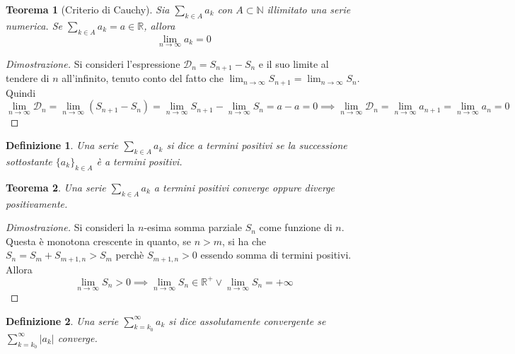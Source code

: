 \documentclass{article}
\newtheorem{theorem}{Teorema}
\newtheorem{definition}{Definizione}
\begin{document}
        \vspace{10pt}
        \begin{theorem}[Criterio di Cauchy]
            Sia $\sum_{k \in A} a_{k}$ con $A \subset \mathbb{N}$ illimitato una serie numerica. Se $\sum_{k \in A} a_{k} = a \in \mathbb{R}$, allora 
            \[
                \lim_{n \rightarrow \infty} a_{k} = 0
            \]
        \end{theorem}
        \begin{proof}[Dimostrazione]
            Si consideri l'espressione $\mathcal{D}_{n} = S_{n + 1} - S_{n}$ e il suo limite al tendere di $n$ all'infinito, tenuto conto del fatto che $\lim_{n \rightarrow \infty} S_{n + 1} = \lim_{n \rightarrow \infty} S_{n}$.
            Quindi
            \[
                \lim_{n \rightarrow \infty} \mathcal{D}_{n} = \lim_{n \rightarrow \infty} (S_{n + 1} - S_{n}) = \lim_{n \rightarrow \infty} S_{n + 1} - \lim_{n \rightarrow \infty} S_{n} = a - a = 0 \implies \lim_{n \rightarrow \infty} \mathcal{D}_{n} = \lim_{n \rightarrow \infty} a_{n + 1} = \lim_{n \rightarrow \infty} a_{n} = 0
            \]
        \end{proof}

        \vspace{10pt}
        \begin{definition}
            Una serie $\sum_{k \in A} a_{k}$ si dice a termini positivi se la successione sottostante $\{a_{k}\}_{k \in A}$ è a termini positivi.
        \end{definition}

        \vspace{10pt}
        \begin{theorem}
            Una serie $\sum_{k \in A} a_{k}$ a termini positivi converge oppure diverge positivamente.
        \end{theorem}
        \begin{proof}[Dimostrazione]
            Si consideri la $n$-esima somma parziale $S_{n}$ come funzione di $n$. Questa è monotona crescente in quanto, se $n > m$, si ha che $S_{n} = S_{m} + S_{m + 1, n} > S_{m}$ perchè $S_{m + 1, n} > 0$ essendo somma di termini positivi.
            Allora 
            \[
                \lim_{n \rightarrow \infty} S_{n} > 0 \implies \lim_{n \rightarrow \infty} S_{n} \in \mathbb{R}^{+} \lor \lim_{n \rightarrow \infty} S_{n} = +\infty
            \]

        \end{proof}

        \vspace{10pt}
        \begin{definition}
            Una serie $\sum_{k = k_{0}}^{\infty} a_{k}$ si dice assolutamente convergente se $\sum_{k = k_{0}}^{\infty} |a_{k}|$ converge.
        \end{definition}
\end{document}
